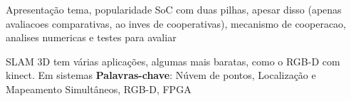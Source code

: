 
\setlength{\absparsep}{18pt} %
\begin{resumo}
	Apresentação tema, popularidade SoC com duas pilhas, apesar disso (apenas avaliacoes comparativas, ao inves de cooperativas), mecanismo de cooperacao, analises numericas e testes para avaliar

	SLAM 3D tem várias aplicações, algumas mais baratas, como o RGB-D com kinect. Em sistemas 
	\vspace{\onelineskip}
	\noindent 
	\textbf{Palavras-chave}: Núvem de pontos, Localização e Mapeamento Simultâneos, RGB-D, FPGA
\end{resumo}

\begin{comment}
\begin{resumo}[Abstract]
	\begin{otherlanguage*}{english}
		Resumo em ingles
		
		\vspace{\onelineskip}
		\noindent 
		\textbf{Keywords}: keyword 1.
	\end{otherlanguage*}
\end{resumo}
\end{comment}